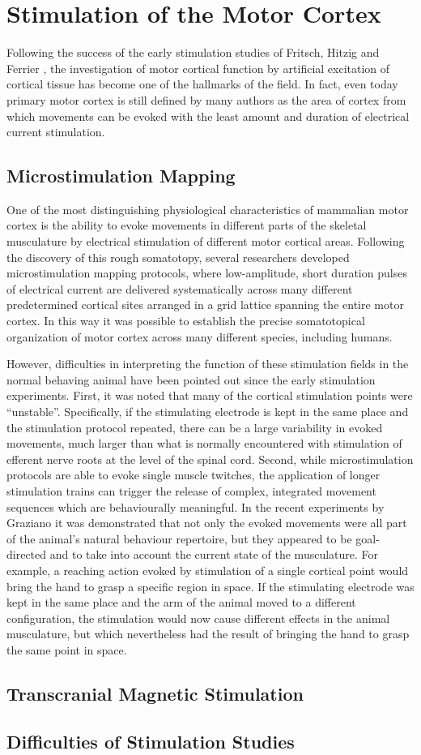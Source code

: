 \section{Stimulation of the Motor Cortex}

Following the success of the early stimulation studies of Fritsch, Hitzig and Ferrier \cite{Fritsch1870,Ferrier1873}, the investigation of motor cortical function by artificial excitation of cortical tissue has become one of the hallmarks of the field. In fact, even today primary motor cortex is still defined by many authors as the area of cortex from which movements can be evoked with the least amount and duration of electrical current stimulation.

\subsection{Microstimulation Mapping}

One of the most distinguishing physiological characteristics of mammalian motor cortex is the ability to evoke movements in different parts of the skeletal musculature by electrical stimulation of different motor cortical areas. Following the discovery of this rough somatotopy, several researchers developed microstimulation mapping protocols, where low-amplitude, short duration pulses of electrical current are delivered systematically across many different predetermined cortical sites arranged in a grid lattice spanning the entire motor cortex. In this way it was possible to establish the precise somatotopical organization of motor cortex across many different species, including humans.

However, difficulties in interpreting the function of these stimulation fields in the normal behaving animal have been pointed out since the early stimulation experiments. First, it was noted that many of the cortical stimulation points were ``unstable''. Specifically, if the stimulating electrode is kept in the same place and the stimulation protocol repeated, there can be a large variability in evoked movements, much larger than what is normally encountered with stimulation of efferent nerve roots at the level of the spinal cord. Second, while microstimulation protocols are able to evoke single muscle twitches, the application of longer stimulation trains can trigger the release of complex, integrated movement sequences which are behaviourally meaningful. In the recent experiments by Graziano it was demonstrated that not only the evoked movements were all part of the animal's natural behaviour repertoire, but they appeared to be goal-directed and to take into account the current state of the musculature. For example, a reaching action evoked by stimulation of a single cortical point would bring the hand to grasp a specific region in space. If the stimulating electrode was kept in the same place and the arm of the animal moved to a different configuration, the stimulation would now cause different effects in the animal musculature, but which nevertheless had the result of bringing the hand to grasp the same point in space.

\subsection{Transcranial Magnetic Stimulation}

\subsection{Difficulties of Stimulation Studies}
